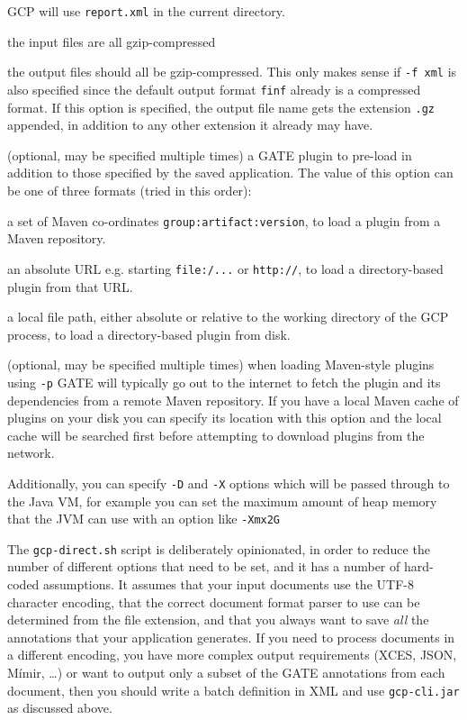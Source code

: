   GCP will use \verb!report.xml! in the current directory.
\item[-ci] the input files are all gzip-compressed
\item[-co] the output files should all be gzip-compressed. This only makes
sense if \verb!-f xml! is also specified since the default output format
\verb!finf! already is a compressed format. If this option is specified, the
output file name gets the extension \verb!.gz! appended, in addition to 
any other extension it already may have.
\item[-p] (optional, may be specified multiple times) a GATE plugin to pre-load
  in addition to those specified by the saved application.  The value of this
  option can be one of three formats (tried in this order):
  \ben
  \item a set of Maven co-ordinates \verb!group:artifact:version!, to load
    a plugin from a Maven repository.
  \item an absolute URL e.g. starting \verb!file:/...! or \verb!http://!, to
    load a directory-based plugin from that URL.
  \item a local file path, either absolute or relative to the working directory
    of the GCP process, to load a directory-based plugin from disk.
  \een
\item[-C] (optional, may be specified multiple times) when loading Maven-style
  plugins using \verb!-p! GATE will typically go out to the internet to fetch the
  plugin and its dependencies from a remote Maven repository.  If you have a local
  Maven cache of plugins on your disk you can specify its location with this option
  and the local cache will be searched first before attempting to download plugins
  from the network.
\ede

Additionally, you can specify \verb!-D! and \verb!-X! options which will be
passed through to the Java VM, for example you can set the maximum amount of
heap memory that the JVM can use with an option like \verb!-Xmx2G!

The \verb!gcp-direct.sh! script is deliberately opinionated, in order to reduce
the number of different options that need to be set, and it has a number of
hard-coded assumptions.  It assumes that your input documents use the UTF-8
character encoding, that the correct document format parser to use can be
determined from the file extension, and that you always want to save \emph{all}
the annotations that your application generates.  If you need to process
documents in a different encoding, you have more complex output requirements
(XCES, JSON, M\'{i}mir, \ldots) or want to output only a subset of the GATE
annotations from each document, then you should write a batch definition in XML
and use \verb!gcp-cli.jar! as discussed above.

